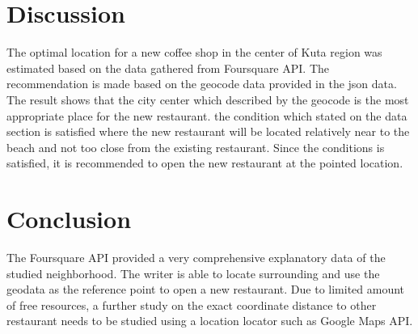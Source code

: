 \documentclass[12pt,letterpaper]{article}
\begin{document}
\section{Discussion}
The optimal location for a new coffee shop in the center of Kuta region was estimated based on the data gathered from Foursquare API. The recommendation is made based on the geocode data provided in the json data. The result shows that the city center which described by the geocode is the most appropriate place for the new restaurant. the condition which stated on the data section is satisfied where the new restaurant will be located relatively near to the beach and not too close from the existing restaurant. Since the conditions is satisfied, it is recommended to open the new restaurant at the pointed location.

\section{Conclusion}
The Foursquare API provided a very comprehensive explanatory data of the studied neighborhood. The writer is able to locate surrounding and use the geodata as the reference point to open a new restaurant. Due to limited amount of free resources, a further study on the exact coordinate distance to other restaurant needs to be studied using a location locator such as Google Maps API.  
\end{document}
